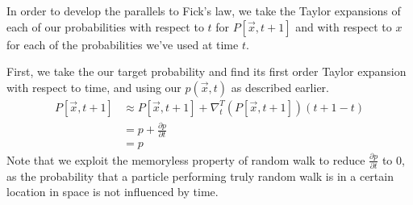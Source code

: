 In order to develop the parallels to Fick's law, we take the Taylor expansions of each of our probabilities with respect to $t$ for $P\left[\vec{x}, t+1\right]$ and with respect to $x$ for each of the probabilities we've used at time $t$.

First, we take the our target probability and find its first order Taylor expansion with respect to time, and using our $p(\vec{x},t)$ as described earlier.
\begin{align*}
    P\left[\vec{x}, t+1\right] &\approx P\left[\vec{x}, t+1\right] + \nabla^T_t\left(P\left[\vec{x}, t+1\right]\right) (t+1-t) \\
    &= p + \frac{\partial p}{\partial t} \\
    &= p
\end{align*}
Note that we exploit the memoryless property of random walk to reduce $\frac{\partial p}{\partial t}$ to 0, as the probability that a particle performing truly random walk is in a certain location in space is not influenced by time.

